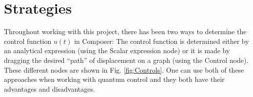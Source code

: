 \documentclass[a4paper, twocolumn]{revtex4-1}
\begin{document}
\section{Strategies}\label{sec:strats}
Throughout working with this project, there has been two ways to determine the control function $u(t)$ in Composer: The control function is determined either by an analytical expression (using the Scalar expression node) or it is made by dragging the desired ``path'' of displacement on a graph (using the Control node). These different nodes are shown in Fig. \ref{fig:Controls}. One can use both of these approaches when working with quantum control and they both have their advantages and disadvantages. \\
\end{document}
